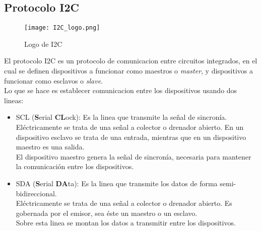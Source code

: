 \documentclass[../informe_krapp.tex]{subfiles}
\begin{document}
\subsection{Protocolo I2C}
\begin{wrapfigure}{r}{0in}
	\centering
	\texttt{[image: I2C\_logo.png]}
	\caption{Logo de I2C}
\end{wrapfigure}
El protocolo I2C es un protocolo de comunicacion entre circuitos integrados,
en el cual se definen dispositivos a funcionar como maestros o \emph{master},
y dispositivos a funcionar como esclavos o \emph{slave}. \\
Lo que se hace es establecer comunicacion entre los dispositivos usando dos lineas:
\begin{itemize}
	\item SCL (\textbf{S}erial \textbf{CL}ock):
	      Es la linea que transmite la señal de sincronía.\\
	      Eléctricamente se trata de una señal a colector o drenador abierto.
	      En un dispositivo esclavo se trata de una entrada,
	      mientras que en un dispositivo maestro es una salida.\\
	      El dispositivo maestro genera la señal de sincronía, necesaria para
	      mantener la comunicación entre los dispositivos.
	\item SDA (\textbf{S}erial \textbf{DA}ta):
	      Es la linea que transmite los datos de forma semi-bidireccional.\\
	      Eléctricamente se trata de una señal a colector o drenador abierto.
	      Es gobernada por el emisor, sea éste un maestro o un esclavo.\\
	      Sobre esta linea se montan los datos a transmitir entre los dispositivos.
\end{itemize}
\end{document}
